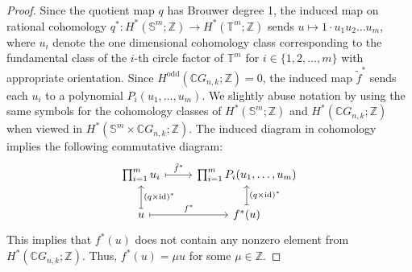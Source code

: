 \documentclass{amsart}
\newtheorem{remark}[theorem]{Remark}
\newcommand{\thmref}[1]{Theorem~\ref{#1}}
\begin{document}
\begin{proof}
		Since the %
quotient map $q$ has Brouwer degree 1, the induced map on %
rational cohomology $q^*: H^*(\mathbb{S}^m; \mathbb{Z}) \rightarrow H^*(\mathbb{T}^m;\mathbb{Z})$ sends $u\mapsto 1\cdot u_1 u_2 \dots u_m$, where $u_i$ denote %
the one dimensional cohomology class corresponding to the fundamental class of the $i$-th circle factor of $\mathbb T^m$ for $i\in \{1,2,\ldots,m\}$ with appropriate orientation. 
		Since $H^{\mathrm{odd}}(\mathbb{C}G_{n,k};\mathbb Z)=0$, the induced map $\tilde f^*$ sends each $u_i$ to a polynomial $P_i(u_1,\dots,u_m)$.  We slightly abuse notation by using the same symbols for the cohomology classes of $H^*(\mathbb S^m;\mathbb Z)$ and $H^*(\mathbb{C}G_{n,k};\mathbb Z)$ when viewed in $H^*(\mathbb S^m\times \mathbb CG_{n,k};\mathbb Z)$.
		The induced diagram in cohomology implies the following %
commutative diagram:
		\[
		\begin{tikzcd}
			{\prod_{i=1}^m u_i} & {\prod_{i=1}^m P_i(u_1,\ldots,u_m)} \\
			u & {f^*(u)}
			\arrow["{\tilde f^*}", maps to, from=1-1, to=1-2]
			\arrow["{(q\times \mathrm{id})^*}"', maps to, from=2-1, to=1-1]
			\arrow["{f^*}", maps to, from=2-1, to=2-2]
			\arrow["{(q\times \mathrm{id})^*}"', maps to, from=2-2, to=1-2]
		\end{tikzcd}
		\]
		This %
implies that $f^*(u)$ does not contain any nonzero element from $H^*(\mathbb{C}G_{n,k};\mathbb Z)$.  
		Thus, $f^*(u)=\mu u$ for some $\mu\in \mathbb Z$.
	\end{proof}
	
	
	
	
	
	
	
	
	
\end{document}
